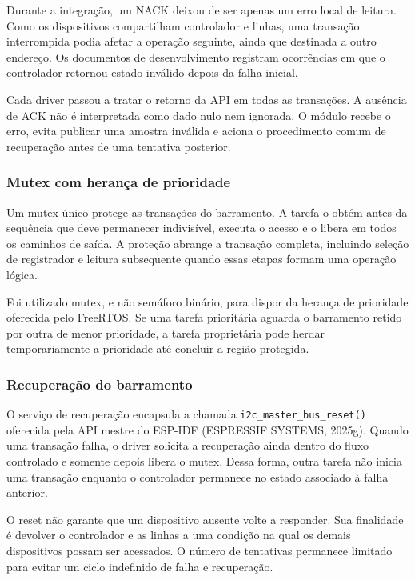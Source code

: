 \documentclass[a4paper,12pt]{article}
\begin{document}
Durante a integra\c{c}\~ao, um NACK deixou de ser apenas um erro local de leitura. Como os dispositivos compartilham controlador e linhas, uma transa\c{c}\~ao interrompida podia afetar a opera\c{c}\~ao seguinte, ainda que destinada a outro endere\c{c}o. Os documentos de desenvolvimento registram ocorr\^encias em que o controlador retornou estado inv\'alido depois da falha inicial.


Cada driver passou a tratar o retorno da API em todas as transa\c{c}\~oes. A aus\^encia de ACK n\~ao \'e interpretada como dado nulo nem ignorada. O m\'odulo recebe o erro, evita publicar uma amostra inv\'alida e aciona o procedimento comum de recupera\c{c}\~ao antes de uma tentativa posterior.


\subsubsection{Mutex com heran\c{c}a de prioridade}


Um mutex \'unico protege as transa\c{c}\~oes do barramento. A tarefa o obt\'em antes da sequ\^encia que deve permanecer indivis\'ivel, executa o acesso e o libera em todos os caminhos de sa\'ida. A prote\c{c}\~ao abrange a transa\c{c}\~ao completa, incluindo sele\c{c}\~ao de registrador e leitura subsequente quando essas etapas formam uma opera\c{c}\~ao l\'ogica.


Foi utilizado mutex, e n\~ao sem\'aforo bin\'ario, para dispor da heran\c{c}a de prioridade oferecida pelo FreeRTOS. Se uma tarefa priorit\'aria aguarda o barramento retido por outra de menor prioridade, a tarefa propriet\'aria pode herdar temporariamente a prioridade at\'e concluir a regi\~ao protegida.


\subsubsection{Recupera\c{c}\~ao do barramento}


O servi\c{c}o de recupera\c{c}\~ao encapsula a chamada \texttt{i2c\_master\_bus\_reset()} oferecida pela API mestre do ESP-IDF (ESPRESSIF SYSTEMS, 2025g). Quando uma transa\c{c}\~ao falha, o driver solicita a recupera\c{c}\~ao ainda dentro do fluxo controlado e somente depois libera o mutex. Dessa forma, outra tarefa n\~ao inicia uma transa\c{c}\~ao enquanto o controlador permanece no estado associado \`a falha anterior.


O reset n\~ao garante que um dispositivo ausente volte a responder. Sua finalidade \'e devolver o controlador e as linhas a uma condi\c{c}\~ao na qual os demais dispositivos possam ser acessados. O n\'umero de tentativas permanece limitado para evitar um ciclo indefinido de falha e recupera\c{c}\~ao.
\end{document}
